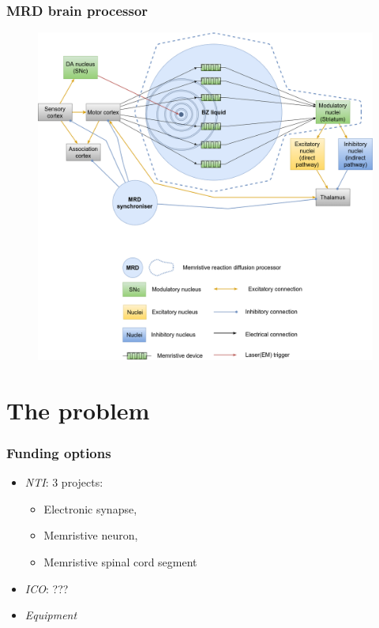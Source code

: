 \documentclass[12pt, aspectratio=169]{beamer}
\begin{document}
\begin{frame}
  \frametitle{MRD brain processor}
  
\begin{figure}
\includegraphics[width=0.85\linewidth]{MRD_modulator_synchroniser}
\end{figure}

\end{frame}


\section{The problem} 
\begin{frame}
\frametitle{Funding options}
\begin{itemize}
\item \emph{NTI}: 3 projects:
\begin{itemize}
\item Electronic synapse,
\item Memristive neuron,
\item Memristive spinal cord segment
\end{itemize}
\item \emph{ICO}: ???
\item \emph{Equipment}
\end{itemize}
\end{frame}
\end{document}
